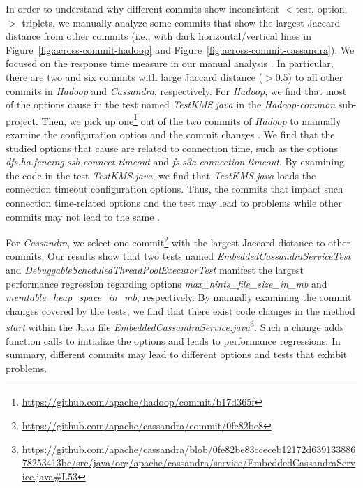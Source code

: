In order to understand why different commits show inconsistent $<$test, option, \inconsistent$>$ triplets, 
we manually analyze some commits that show the largest Jaccard distance from other commits (i.e., with dark horizontal/vertical lines in Figure~\ref{fig:across-commit-hadoop} and Figure~\ref{fig:across-commit-cassandra}). We focused on the response time measure in our manual analysis . 
In particular, there are two and six commits with large Jaccard distance ($>0.5$) to all other commits in \emph{Hadoop} and \emph{Cassandra}, respectively. 
For \emph{Hadoop}, we find that most of the options cause \inconsistent in the test named \emph{TestKMS.java} in the \emph{Hadoop-common} sub-project. 
Then, we pick up one\footnote{\url{https://github.com/apache/hadoop/commit/b17d365f}} out of the two commits of \emph{Hadoop} to manually examine the configuration option and the commit changes . %
We find that the studied options that cause \inconsistent are related to connection time, such as the options \emph{dfs.ha.fencing.ssh.connect-timeout} and \emph{fs.s3a.connection.timeout}. By examining the code in the test \emph{TestKMS.java}, we find that \emph{TestKMS.java} loads the connection timeout configuration options. 
Thus, the commits that impact such connection time-related options and the test may lead to \inconsistent problems while other commits may not lead to the same \inconsistent. 

For \emph{Cassandra}, we select one commit\footnote{\url{https://github.com/apache/cassandra/commit/0fe82be8}} with the largest Jaccard distance to other commits. Our results show that two tests named \emph{EmbeddedCassandraServiceTest} and \emph{DebuggableScheduledThreadPoolExecutorTest} manifest the largest performance regression regarding options \emph{max\_hints\_file\_size\_in\_mb} and \emph{memtable\_heap\_space\_in\_mb}, respectively. By manually examining the commit changes covered by the tests, we find that there exist code changes in the method \emph{start} within the Java file \emph{EmbeddedCassandraService.java}\footnote{\url{https://github.com/apache/cassandra/blob/0fe82be83cceceb12172d63913388678253413bc/src/java/org/apache/cassandra/service/EmbeddedCassandraService.java\#L53}}. Such a change adds function calls to initialize the options and leads to performance regressions. 
In summary, different commits may lead to different options and tests that exhibit \inconsistent problems. 




